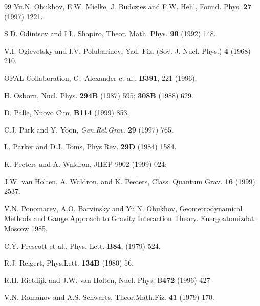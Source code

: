 \begin{thebibliography}{99}
 Yu.N. Obukhov, E.W. Mielke, J. Budczies and F.W. Hehl,
Found. Phys. {\bf 27} (1997) 1221.  %

 S.D. Odintsov and I.L. Shapiro, 
Theor. Math. Phys. {\bf 90} (1992) 148.

 V.I. Ogievetsky and I.V. Polubarinov, Yad. Fiz. 
(Sov. J.  Nucl. Phys.) {\bf 4} (1968) 210.

 OPAL Collaboration, 
G.~Alexander et al., {\bf B391}, 221 (1996).

 H. Osborn,
Nucl. Phys. {\bf 294B} (1987) 595; {\bf 308B} (1988) 629.


D. Palle, Nuovo Cim. {\bf B114} (1999) 853.  %

C.J. Park and Y. Yoon, {\sl Gen.Rel.Grav.}
{\bf 29} (1997) 765.

L. Parker and D.J. Toms, Phys.Rev. {\bf 29D} (1984) 1584.


 K. Peeters and A. Waldron,
JHEP 9902 (1999) 024;

J.W. van Holten, A. Waldron, and K. Peeters,
Class. Quantum Grav. {\bf 16} (1999) 2537.

V.N. Ponomarev, A.O. Barvinsky and Yu.N. Obukhov,
      Geometrodynamical
      Methods and Gauge Approach to Gravity Interaction Theory.
      Energoatomizdat, Moscow 1985.

 C.Y. Prescott et al., 
Phys. Lett. {\bf B84}, (1979) 524.


R.J. Reigert, Phys.Lett. {\bf 134B} (1980) 56.

R.H. Rietdijk and J.W. van Holten, Nucl. Phys. B{\bf 472} (1996) 427

V.N. Romanov and A.S. Schwarts, Theor.Math.Fiz. {\bf 41} (1979) 170.


\end{thebibliography}
